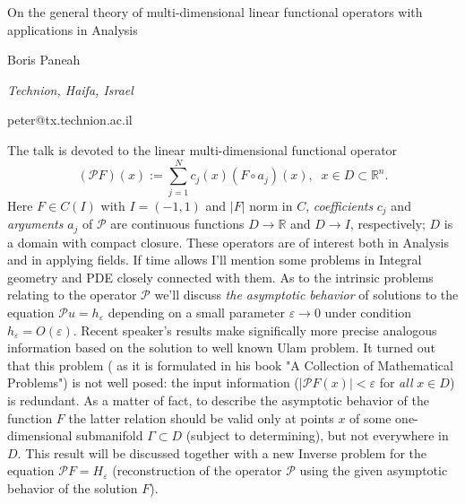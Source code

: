 \documentclass[10pt,a4paper]{article}
\begin{document}
\begin{center}

{\Large On the general theory of multi-dimensional  linear functional operators with applications in Analysis}

\bigskip

{\sc Boris Paneah} 

{\small\it Technion, Haifa, Israel}

{\small\rm peter@tx.technion.ac.il}

\end{center}

\bigskip

The talk is devoted to the linear multi-dimensional functional operator
$$
(\mathcal{P}F)(x):=\sum^N_{j=1} c_j(x) (F\circ a_j)(x),\;\; x\in D\subset \mathbb{R}^n.
$$
Here $F\in C(I)$ with $I=(-1,1)$ and $|F|$ norm in $C$, {\it coefficients} $c_j$ and {\it arguments} $a_j$ of $\mathcal{P}$ are continuous functions $D\rightarrow \mathbb{R}$ and $D\rightarrow I$, respectively; $D$ is a domain with compact closure. These operators are of interest both in Analysis and in applying fields. If time allows I'll mention some problems in Integral geometry and PDE closely connected with them. As to the intrinsic problems relating to the operator $\mathcal{P}$ we'll discuss {\it the asymptotic behavior} of solutions to the equation $\mathcal{P}u=h_\varepsilon$ depending on a small parameter $\varepsilon\rightarrow 0$ under condition $h_\varepsilon=O(\varepsilon)$. Recent speaker's results make significally more precise analogous information based on the solution to well known Ulam problem. It turned out that this problem ( as it is formulated in his book "A Collection of  Mathematical Problems") is not well posed: the input information ($|\mathcal{P}F(x)|<\varepsilon $  for {\it all} $x\in D$) is redundant. As a matter of fact, to describe the asymptotic behavior of the function $F$ the latter relation should be valid only at points $x$ of some one-dimensional submanifold $\Gamma\subset D$ (subject to determining), but not everywhere in $D$. This result will be discussed together with a new Inverse problem for the equation $\mathcal{P}F=H_\varepsilon$ (reconstruction  of the operator $\mathcal{P}$ using the given asymptotic behavior of the solution $F$).
\end{document}
